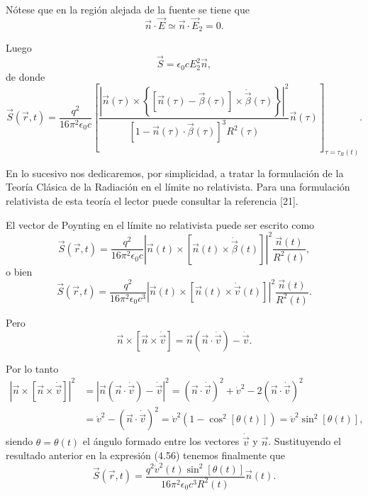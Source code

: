\documentclass[12pt,a4paper]{book}
\begin{document}
Nótese que en la región alejada de la fuente se tiene que
\begin{equation}
\vec{n} \cdot \vec{E} \simeq \vec{n} \cdot \vec{E}_2 = 0.
\end{equation}

Luego
\begin{equation}
\vec{S} = \epsilon_0 cE_2^2\vec{n},
\end{equation}
de donde
\begin{equation}
\vec{S}(\vec{r}, t) = \frac{q^2}{16\pi^2\epsilon_0c}\left[\frac{\left|\vec{n}(\tau) \times \left\{\left[\vec{n}(\tau) - \vec{\beta}(\tau)\right] \times \dot{\vec{\beta}}(\tau)\right\}\right|^2}{\left[1 - \vec{n}(\tau) \cdot \vec{\beta}(\tau)\right]^3 R^2(\tau)}\vec{n}(\tau)\right]_{\tau=\tau_R(t)}.
\end{equation}

En lo sucesivo nos dedicaremos, por simplicidad, a tratar la formulación de la Teoría Clásica de la Radiación en el límite no relativista. Para una formulación relativista de esta teoría el lector puede consultar la referencia [21].

El vector de Poynting en el límite no relativista puede ser escrito como
\begin{equation}
\vec{S}(\vec{r}, t) = \frac{q^2}{16\pi^2\epsilon_0c}\left|\vec{n}(t) \times \left[\vec{n}(t) \times \dot{\vec{\beta}}(t)\right]\right|^2\frac{\vec{n}(t)}{R^2(t)},
\end{equation}
o bien
\begin{equation}
\vec{S}(\vec{r}, t) = \frac{q^2}{16\pi^2\epsilon_0c^3}\left|\vec{n}(t) \times \left[\vec{n}(t) \times \dot{\vec{v}}(t)\right]\right|^2\frac{\vec{n}(t)}{R^2(t)}.
\end{equation}

Pero
\begin{equation}
\vec{n} \times [\vec{n} \times \dot{\vec{v}}] = \vec{n}(\vec{n} \cdot \dot{\vec{v}}) - \dot{\vec{v}}.
\end{equation}

Por lo tanto
\begin{align}
\left|\vec{n} \times [\vec{n} \times \dot{\vec{v}}]\right|^2 &= \left|\vec{n}(\vec{n} \cdot \dot{\vec{v}}) - \dot{\vec{v}}\right|^2 = (\vec{n} \cdot \dot{\vec{v}})^2 + \dot{v}^2 - 2(\vec{n} \cdot \dot{\vec{v}})^2 \nonumber \\
&= \dot{v}^2 - (\vec{n} \cdot \dot{\vec{v}})^2 = \dot{v}^2\left(1 - \cos^2[\theta(t)]\right) = \dot{v}^2\sin^2[\theta(t)],
\end{align}
siendo $\theta = \theta(t)$ el ángulo formado entre los vectores $\dot{\vec{v}}$ y $\vec{n}$. Sustituyendo el resultado anterior en la expresión (4.56) tenemos finalmente que
\begin{equation}
\vec{S}(\vec{r}, t) = \frac{q^2\dot{v}^2(t)\sin^2[\theta(t)]}{16\pi^2\epsilon_0c^3R^2(t)}\vec{n}(t).
\end{equation}
\end{document}
